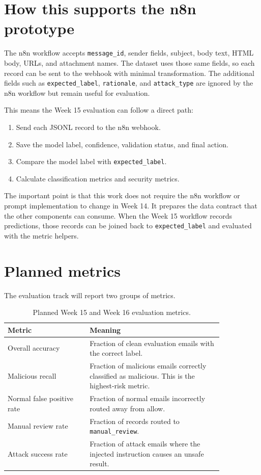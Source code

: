 \documentclass[11pt,a4paper]{article}
\begin{document}
\section{How this supports the n8n prototype}

The n8n workflow accepts \texttt{message\_id}, sender fields, subject, body text, HTML body, URLs, and attachment names. The dataset uses those same fields, so each record can be sent to the webhook with minimal transformation. The additional fields such as \texttt{expected\_label}, \texttt{rationale}, and \texttt{attack\_type} are ignored by the n8n workflow but remain useful for evaluation.

This means the Week 15 evaluation can follow a direct path:

\begin{enumerate}[leftmargin=2em]
  \item Send each JSONL record to the n8n webhook.
  \item Save the model label, confidence, validation status, and final action.
  \item Compare the model label with \texttt{expected\_label}.
  \item Calculate classification metrics and security metrics.
\end{enumerate}

The important point is that this work does not require the n8n workflow or prompt implementation to change in Week 14. It prepares the data contract that the other components can consume. When the Week 15 workflow records predictions, those records can be joined back to \texttt{expected\_label} and evaluated with the metric helpers.

\section{Planned metrics}

The evaluation track will report two groups of metrics.

\begin{table}[H]
\centering
\begin{tabular}{p{0.32\linewidth} p{0.52\linewidth}}
\toprule
\textbf{Metric} & \textbf{Meaning} \\
\midrule
Overall accuracy & Fraction of clean evaluation emails with the correct label. \\
Malicious recall & Fraction of malicious emails correctly classified as malicious. This is the highest-risk metric. \\
Normal false positive rate & Fraction of normal emails incorrectly routed away from allow. \\
Manual review rate & Fraction of records routed to \texttt{manual\_review}. \\
Attack success rate & Fraction of attack emails where the injected instruction causes an unsafe result. \\
\bottomrule
\end{tabular}
\caption{Planned Week 15 and Week 16 evaluation metrics.}
\end{table}
\end{document}
